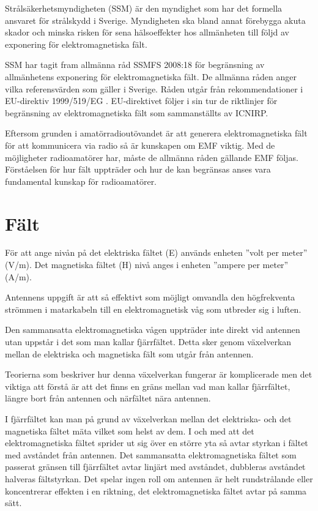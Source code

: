 Strålsäkerhetsmyndigheten (SSM) är den myndighet som har det formella ansvaret
för strålskydd i Sverige.
Myndigheten ska bland annat förebygga akuta skador och minska risken för sena
hälsoeffekter hos allmänheten till följd av exponering för elektromagnetiska
fält.

SSM har tagit fram allmänna råd SSMFS 2008:18 \cite{SSMFS2008:18} för
begränsning av allmänhetens exponering för elektromagnetiska fält.
De allmänna råden anger vilka referensvärden som gäller i Sverige.
Råden utgår från rekommendationer i EU-direktiv 1999/519/EG \cite{1999/519/EG}.
EU-direktivet följer i sin tur de riktlinjer för begränsning av
elektromagnetiska fält som sammanställts av ICNIRP.

Eftersom grunden i amatörradioutövandet är att generera elektromagnetiska fält
för att kommunicera via radio så är kunskapen om EMF viktig.
Med de möjligheter radioamatörer har, måste de allmänna råden gällande EMF
följas.
Förståelsen för hur fält uppträder och hur de kan begränsas anses vara
fundamental kunskap för radioamatörer.

\section{Fält}
För att ange nivån på det elektriska fältet (E) används enheten
''volt per meter'' (V/m).
Det magnetiska fältet (H) nivå anges i enheten ''ampere per meter'' (A/m).

Antennens uppgift är att så effektivt som möjligt omvandla den högfrekventa
strömmen i matarkabeln till en elektromagnetisk våg som utbreder sig i luften. 

Den sammansatta elektromagnetiska vågen uppträder inte direkt vid antennen utan
uppstår i det som man kallar fjärrfältet.
Detta sker genom växelverkan mellan de elektriska och magnetiska fält som
utgår från antennen.

Teorierna som beskriver hur denna växelverkan fungerar är komplicerade
men det viktiga att förstå är att det finns en gräns mellan vad man
kallar fjärrfältet, längre bort från antennen och närfältet nära antennen.

I fjärrfältet kan man på grund av växelverkan mellan det elektriska- och det
magnetiska fältet mäta vilket som helst av dem.
I och med att det elektromagnetiska fältet sprider ut sig över en större yta så
avtar styrkan i fältet med avståndet från antennen.
Det sammansatta elektromagnetiska fältet som passerat gränsen till fjärrfältet
avtar linjärt med avståndet, dubbleras avståndet halveras fältstyrkan.
Det spelar ingen roll om antennen är helt rundstrålande eller koncentrerar
effekten i en riktning, det elektromagnetiska fältet avtar på samma sätt.

